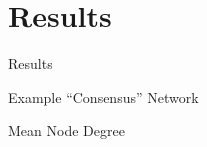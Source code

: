 \documentclass[dvipsnames]{beamer}
\begin{document}
\section{Results}
\begin{frame}{}
    \begin{center}
        \Huge \textcolor{OliveGreen}{Results}
    \end{center}
    \addtocounter{framenumber}{-1}
\end{frame}
\begin{frame}[fragile]{Example “Consensus” Network}
    \vspace{-0.05in}
\end{frame}
\begin{frame}[fragile]{Mean Node Degree}
    \begin{figure}[htb!]
    \end{figure}
\end{frame}
\end{document}
